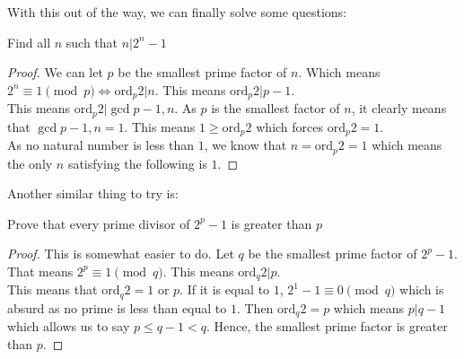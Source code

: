 With this out of the way, we can finally solve some questions:\\
\begin{example}
    Find all $n$ such that $n|2^n-1$
\end{example}
\begin{proof}
    We can let $p$ be the smallest prime factor of $n$. Which means $2^n \equiv 1 \pmod{p} \iff \text{ord}_p{2}|n$. This means $\text{ord}_p{2}|p-1$.\\
    This means $\text{ord}_p{2}|\gcd{p-1,n}$. As $p$ is the smallest factor of $n$, it clearly means that $\gcd{p-1,n}=1$. This means $1 \geq \text{ord}_p{2}$ which forces $\text{ord}_p{2}=1$.\\
    As no natural number is less than $1$, we know that $n=\text{ord}_p{2}=1$ which means the only $n$ satisfying the following is $1$.
\end{proof}
Another similar thing to try is:\\
\begin{example}
    Prove that every prime divisor of $2^p - 1$ is greater than $p$
\end{example}
\begin{proof}
    This is somewhat easier to do. Let $q$ be the smallest prime factor of $2^p-1$.\\
    That means $2^p \equiv 1 \pmod{q}$. This means $\text{ord}_q{2}|p$.\\
    This means that $\text{ord}_q{2} = 1$ or $p$. If it is equal to $1$, $2^1-1 \equiv 0\pmod{q}$ which is absurd as no prime is less than equal to $1$. Then $\text{ord}_q{2}=p$ which means $p|q-1$ which allows us to say $p\leq q-1 < q$. Hence, the smallest prime factor is greater than $p$.
\end{proof}
